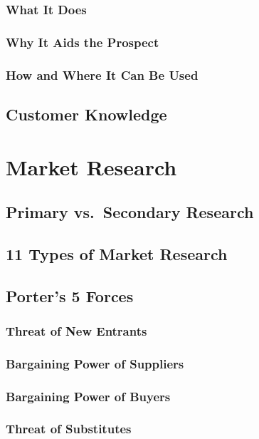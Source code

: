         \subsubsection{What It Does}\mbox{}
        \subsubsection{Why It Aids the Prospect}\mbox{}
        \subsubsection{How and Where It Can Be Used}\mbox{}
    \subsection{Customer Knowledge}\mbox{}

\section{Market Research}\mbox{}
    \subsection{Primary vs.\ Secondary Research}\mbox{}
    \subsection{11 Types of Market Research}\mbox{}
    \subsection{Porter's 5 Forces}\mbox{}
        \subsubsection{Threat of New Entrants}\mbox{}
        \subsubsection{Bargaining Power of Suppliers}\mbox{}
        \subsubsection{Bargaining Power of Buyers}\mbox{}
        \subsubsection{Threat of Substitutes}\mbox{}
